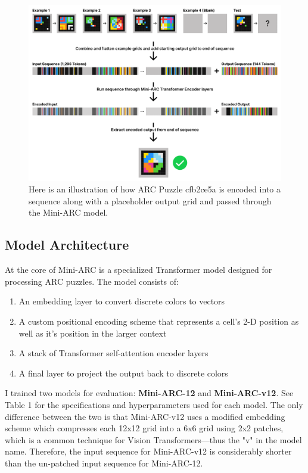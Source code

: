 \documentclass[10pt,twocolumn]{article}
\begin{document}
\begin{figure}[ht!]
  \centering
  \includegraphics[width=\textwidth]{figures/sequence.png}
  \caption{Here is an illustration of how ARC Puzzle cfb2ce5a is
    encoded into a sequence along with a placeholder output grid and
  passed through the Mini-ARC model.}
  \label{fig:sequence-fig}
\end{figure}

\subsection{Model Architecture}

At the core of Mini-ARC is a specialized Transformer model designed
for processing ARC puzzles. The model consists of:
\begin{enumerate}
  \item An embedding layer to convert discrete colors to vectors
  \item A custom positional encoding scheme that represents a cell's
    2-D position as well as it's position in the larger context
  \item A stack of Transformer self-attention encoder layers
  \item A final layer to project the output back to discrete colors
\end{enumerate}

I trained two models for evaluation: \textbf{Mini-ARC-12} and
\textbf{Mini-ARC-v12}. See Table 1 for the specifications and
hyperparameters used for each model. The only difference between the
two is that Mini-ARC-v12 uses a modified embedding scheme which
compresses each 12x12 grid into a 6x6 grid using 2x2
patches\cite{dosovitskiy2021imageworth16x16words}, which
is a common technique for Vision Transformers—thus the "v" in the
model name. Therefore, the input sequence for
Mini-ARC-v12 is considerably shorter than the un-patched input
sequence for Mini-ARC-12.
\end{document}
